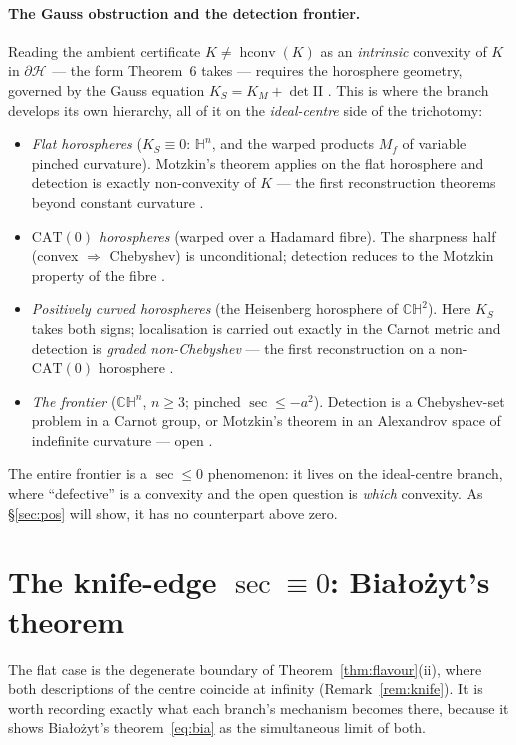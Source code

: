 \documentclass[11pt]{article}
\theoremstyle{remark}
\newcommand{\Hb}[1]{\mathcal{H}_{#1}}
\newcommand{\hconv}{\operatorname{hconv}}
\newcommand{\sect}{\operatorname{sec}}
\newcommand{\HH}{\mathbb{H}}
\newcommand{\CH}{\mathbb{CH}}
\begin{document}
\paragraph{The Gauss obstruction and the detection frontier.} Reading the
ambient certificate $K\neq\hconv(K)$ as an \emph{intrinsic} convexity of
$K$ in $\partial\Hb{}$ --- the form Theorem~6 takes --- requires the
horosphere geometry, governed by the Gauss equation $K_{S}=K_{M}
+\det\mathrm{II}$ \cite[Prop.~4.1]{R3}. This is where the branch develops
its own hierarchy, all of it on the \emph{ideal-centre} side of the
trichotomy:
\begin{itemize}
\item \emph{Flat horospheres} ($K_{S}\equiv0$: $\HH^{n}$, and the warped
products $M_{f}$ of variable pinched curvature). Motzkin's theorem applies
on the flat horosphere and detection is exactly non-convexity of $K$ ---
the first reconstruction theorems beyond constant curvature
\cite[Thm.~7.2]{R3}.
\item \emph{$\mathrm{CAT}(0)$ horospheres} (warped over a Hadamard fibre).
The sharpness half (convex $\Rightarrow$ Chebyshev) is unconditional;
detection reduces to the Motzkin property of the fibre
\cite[Thm.~8.3]{R3}.
\item \emph{Positively curved horospheres} (the Heisenberg horosphere of
$\CH^{2}$). Here $K_{S}$ takes both signs; localisation is carried out
exactly in the Carnot metric and detection is \emph{graded non-Chebyshev}
--- the first reconstruction on a non-$\mathrm{CAT}(0)$ horosphere
\cite[Thm.~9.2]{R3}.
\item \emph{The frontier} ($\CH^{n}$, $n\ge3$; pinched $\sect\le-a^{2}$).
Detection is a Chebyshev-set problem in a Carnot group, or Motzkin's
theorem in an Alexandrov space of indefinite curvature --- open
\cite[\S10]{R3}.
\end{itemize}
The entire frontier is a $\sect\le0$ phenomenon: it lives on the
ideal-centre branch, where ``defective'' is a convexity and the open
question is \emph{which} convexity. As \S\ref{sec:pos} will show, it has no
counterpart above zero.

\section{The knife-edge $\sect\equiv0$: Bia\l{}o\.zyt's theorem}
\label{sec:flat}

The flat case is the degenerate boundary of Theorem~\ref{thm:flavour}(ii),
where both descriptions of the centre coincide at infinity
(Remark~\ref{rem:knife}). It is worth recording exactly what each branch's
mechanism becomes there, because it shows Bia\l{}o\.zyt's
theorem~\eqref{eq:bia} as the simultaneous limit of both.
\end{document}
